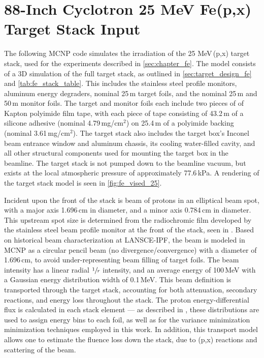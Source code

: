 % 



\section{88-Inch Cyclotron 25 MeV Fe(p,x) Target Stack Input} \label{sec:88_mcnp_deck_lowE}



The following MCNP code simulates the irradiation of the 25 MeV\,(p,x) target stack, used for the experiments described in  \autoref{sec:chapter_fe}.
The model consists of a 3D simulation of the full target stack, as outlined in \autoref{sec:target_design_fe} and  \autoref{tab:fe_stack_table}.
This includes the stainless steel profile monitors, aluminum energy degraders, nominal 25\,\mmicro m  target foils, and the nominal 25\,\mmicro m   and 50\,\mmicro m  monitor foils.
The target and monitor foils each include two pieces of of Kapton polyimide film tape, with each piece of  tape consisting of 43.2\,\mmicro m of a silicone adhesive (nominal 4.79\,mg/cm$^2$) on 25.4\,\mmicro m of a polyimide backing (nominal 3.61\,mg/cm$^2$).
The target stack also includes the target box's Inconel beam entrance window and aluminum chassis, its cooling water-filled cavity, and all other structural components used for mounting the target box in the beamline.
The target stack is not pumped down to the beamline vacuum, but exists at the local atmospheric pressure of approximately 77.6\,kPa.
A rendering of the target stack model  is seen in \autoref{fig:fe_vised_25}.




Incident upon the front of the stack is  beam of protons in an elliptical beam spot, with a major axis 1.696\,cm in diameter, and a minor axis 0.784\,cm in diameter.  
This upstream spot size is determined from the radiochromic film developed by the  stainless steel beam profile monitor at the front of the stack, seen in .
Based on historical beam characterization at LANSCE-IPF, the beam is modeled in MCNP as a circular pencil beam (no divergence/convergence) with a diameter of 1.696\,cm, to avoid under-representing beam filling of target foils.
The beam intensity has a linear radial $\sfrac{1}{r}$ intensity, and an average energy of 100\,MeV  with a Gaussian energy distribution width of 0.1\,MeV.
This beam definition is transported through the target stack, accounting for both attenuation, secondary reactions, and energy loss throughout the stack.
The proton energy-differential flux is calculated in each stack element --- as described in ,  these distributions are used to assign energy bins  to each foil, as well as for the variance minimization minimization techniques employed in this work.
In addition, this transport model allows one to estimate the fluence loss down the stack, due to (p,x) reactions and scattering of the beam.


% 
